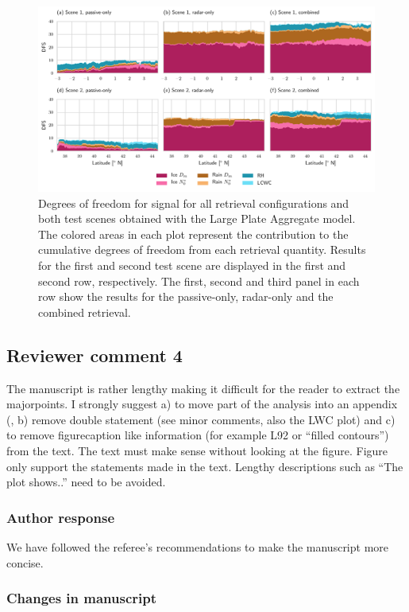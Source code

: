 \begin{figure}[!hbpt]
  \centering
  \includegraphics[width=\textwidth]{../plots/dfs}
\caption{Degrees of freedom for signal for all retrieval configurations and both
  test scenes obtained with the Large Plate Aggregate model. The colored areas
  in each plot represent the contribution to the cumulative degrees of freedom
  from each retrieval quantity. Results for the first and second test scene
  are displayed in the first and second row, respectively. The first, second
  and third panel in each row show the results for the passive-only, radar-only
  and the combined retrieval.}
\label{fig:dfs}
\end{figure}

\subsection*{Reviewer comment 4}

The manuscript is rather lengthy making it difficult for the reader to
extract the majorpoints. I strongly suggest a) to move part of the analysis into
an appendix (, b) remove double statement (see minor comments, also the LWC
plot) and c) to remove figurecaption like information (for example L92 or
“filled contours”) from the text. The text must make sense without looking at
the figure. Figure only support the statements made in the text. Lengthy
descriptions such as ``The plot shows..'' need to be avoided.

\subsubsection*{Author response}

We have followed  the referee's recommendations to make the manuscript more
concise.

\subsubsection*{Changes in manuscript}

